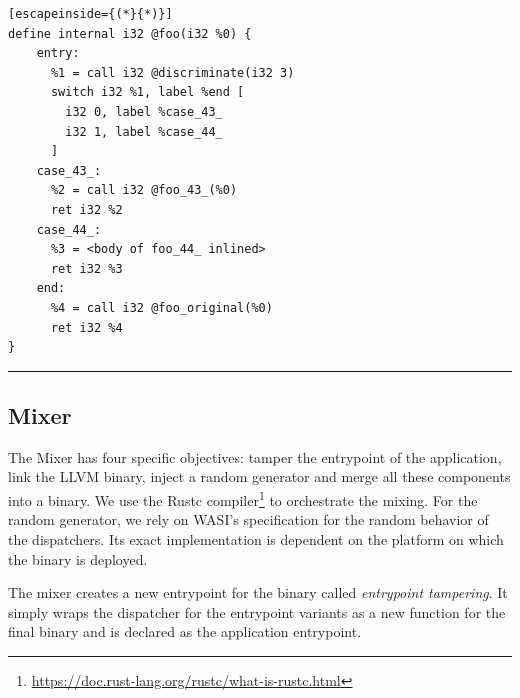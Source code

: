 \lstset{
    language=llvm,
    basicstyle=\footnotesize\ttfamily,
    columns=fullflexible,
    breaklines=true,
    numbers=none,
    stepnumber=1,
    float
}

\begin{code}
\scriptsize
\noindent\begin{minipage}[b]{\linewidth}
    \begin{minipage}[t]{1\linewidth}
        \begin{lstlisting}[escapeinside={(*}{*)}]
define internal i32 @foo(i32 %0) {
    entry:
      %1 = call i32 @discriminate(i32 3)
      switch i32 %1, label %end [
        i32 0, label %case_43_
        i32 1, label %case_44_
      ]
    case_43_:                 
      %2 = call i32 @foo_43_(%0)
      ret i32 %2
    case_44_:                
      %3 = <body of foo_44_ inlined>
      ret i32 %3
    end:                                             
      %4 = call i32 @foo_original(%0)
      ret i32 %4
}
        \end{lstlisting}
    \end{minipage}%
    
    \noindent\rule{\linewidth}{0.4pt}
    \label{listing:multivariant_template}
\end{minipage}
\end{code}

\subsection*{Mixer}

The Mixer has four specific objectives: tamper the entrypoint of the application, link the LLVM binary, inject a random generator and merge all these components into a \wasm binary.
We use the Rustc compiler\footnote{\url{https://doc.rust-lang.org/rustc/what-is-rustc.html}} to orchestrate the mixing.
For the random generator, we rely on WASI's specification \cite{WASI} for the random behavior of the dispatchers. Its exact implementation is dependent on the platform on which the binary is deployed.

The \tool mixer creates a new entrypoint for the binary called \emph{entrypoint tampering}.
It simply wraps the dispatcher for the entrypoint variants as a new function for the final binary and is declared as the application entrypoint. %

